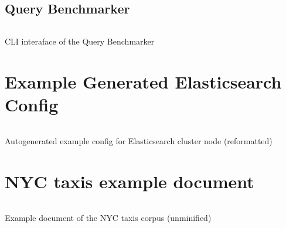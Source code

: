 \subsection{Query Benchmarker}
\begin{listing}[H]
  \inputminted{text}{./assets/query.txt}
\caption{CLI interaface of the Query Benchmarker}
\end{listing}

\section{Example Generated Elasticsearch Config}
\begin{listing}[H]
  \inputminted{yaml}{./assets/es_cfg_example.yml}
\caption{Autogenerated example config for Elasticsearch cluster node (reformatted)}
\end{listing}

\section{NYC taxis example document}
\begin{listing}[H]
  \inputminted{json}{./assets/nyc_example.json}
\caption{Example document of the NYC taxis corpus (unminified)}
\end{listing}
